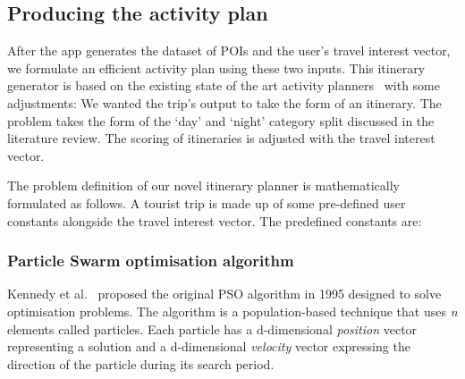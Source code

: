 
\subsection{Producing the activity plan}

After the app generates the dataset of POIs and the
user's travel interest vector, we formulate an
efficient activity plan using these two inputs. This
itinerary generator is based on the existing state of
the art activity planners~\cite{Sylejmani2017, Wisittipanich2020}
with some adjustments: We wanted the trip's output to take the
form of an itinerary.  The problem takes the form of
the `day' and `night'  category split discussed in
the literature review.  The scoring of itineraries is adjusted
with the travel interest vector.

The problem definition of our novel itinerary planner
is mathematically formulated as follows. A tourist trip is made up
of some pre-defined user constants alongside the travel interest
vector. The predefined constants are:
\\


\subsubsection{Particle Swarm optimisation algorithm}


Kennedy et al.~\cite{Kennedy} proposed the original PSO algorithm in
1995 designed to solve optimisation problems. The
algorithm is a population-based technique that uses \textit{n}
elements called particles. Each particle has a
d-dimensional \textit{position} vector representing a solution
and a d-dimensional \textit{velocity} vector expressing the
direction of the particle during its search period. 

